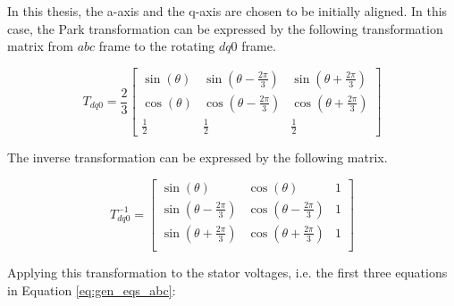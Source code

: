 In this thesis, the a-axis and the q-axis are chosen to be initially aligned. In this
case, the Park transformation can be expressed by the following transformation matrix
from $abc$ frame to the rotating $dq0$ frame.

\begin{equation}
    T_{dq0} = 
    \frac{2}{3}
    \begin{bmatrix}
        \sin{(\theta)} & \sin{\left(\theta - \frac{2\pi}{3}\right)} & \sin{\left(\theta + \frac{2\pi}{3}\right)}\\
        \cos{(\theta)} & \cos{\left(\theta - \frac{2\pi}{3}\right)} & \cos{\left(\theta + \frac{2\pi}{3}\right)}\\
        \frac{1}{2} & \frac{1}{2} & \frac{1}{2}
    \end{bmatrix}
    \label{eq:park_transformation}
\end{equation}

The inverse transformation can be expressed by the following matrix.

\begin{equation}
    T_{dq0}^{-1} = 
    \begin{bmatrix}
        \sin{(\theta)} & \cos{(\theta)} & 1 \\
        \sin{(\theta-\frac{2\pi}{3})} & \cos{(\theta-\frac{2\pi}{3})} & 1 \\
        \sin{(\theta+\frac{2\pi}{3})} & \cos{(\theta+\frac{2\pi}{3})} & 1 \\
    \end{bmatrix}
    \label{eq:park_inverse_transformation}
\end{equation}

Applying this transformation to the stator voltages, i.e. the first three
equations in Equation \ref{eq:gen_eqs_abc}:

